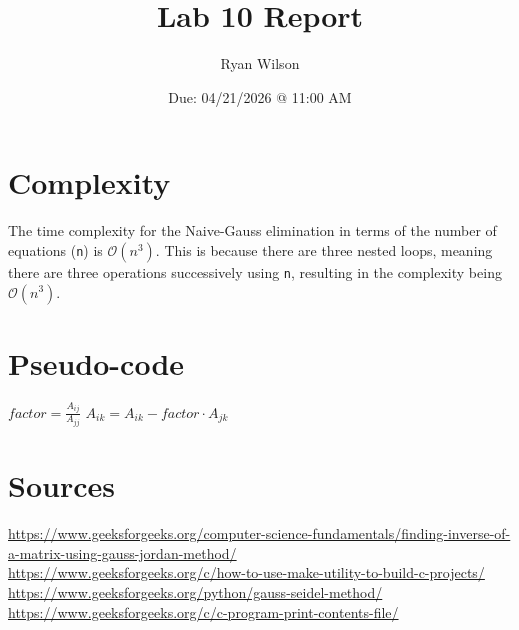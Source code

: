 \documentclass{article}
\title{Lab 10 Report}
\date{Due: 04/21/2026 @ 11:00 AM}
\author{Ryan Wilson}
\begin{document}
\maketitle
\newpage

\section{Complexity}

The time complexity for the Naive-Gauss elimination in terms of the number of equations (\texttt{n}) is $\mathcal{O}(n^3)$. This is because there are three nested loops, meaning there are three operations successively using \texttt{n}, resulting in the complexity being $\mathcal{O}(n^3)$.

\section{Pseudo-code}

\begin{algorithm}
\caption{Naive Gaussian Elimination}
\begin{algorithmic}[1]
            \State $factor = \frac{A_{ij}}{A_{jj}}$
                \State $A_{ik} = A_{ik} - factor \cdot A_{jk}$
            \EndFor
        \EndIf
    \EndFor
\EndFor
\end{algorithmic}
\end{algorithm}

\section{Sources}
\url{https://www.geeksforgeeks.org/computer-science-fundamentals/finding-inverse-of-a-matrix-using-gauss-jordan-method/}\\
\url{https://www.geeksforgeeks.org/c/how-to-use-make-utility-to-build-c-projects/}\\
\url{https://www.geeksforgeeks.org/python/gauss-seidel-method/}\\
\url{https://www.geeksforgeeks.org/c/c-program-print-contents-file/}\\
\end{document}
